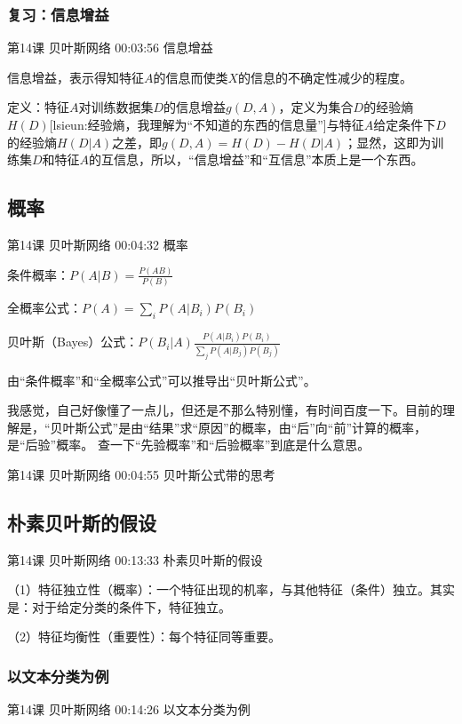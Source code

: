 \documentclass[UTF8]{ctexart}
\begin{document}
\subsubsection{复习：信息增益}

第14课 贝叶斯网络 00:03:56 信息增益

信息增益，表示得知特征$A$的信息而使类$X$的信息的不确定性减少的程度。

定义：特征$A$对训练数据集$D$的信息增益$g(D,A)$，定义为集合$D$的经验熵$H(D)$[lsieun:经验熵，我理解为“不知道的东西的信息量”]与特征$A$给定条件下$D$的经验熵$H(D|A)$之差，即$g(D,A)=H(D)-H(D|A)$；显然，这即为训练集$D$和特征$A$的互信息，所以，“信息增益”和“互信息”本质上是一个东西。

\subsection{概率}

第14课 贝叶斯网络 00:04:32 概率

条件概率：$P(A|B)=\frac{P(AB)}{P(B)}$

全概率公式：$P(A)=\sum_{i}P(A|B_{i})P(B_{i})$

贝叶斯（Bayes）公式：$P(B_{i}|A)\frac{P(A|B_{i})P(B_{i})}{\sum_{j}P(A|B_{j})P(B_{j})}$

由“条件概率”和“全概率公式”可以推导出“贝叶斯公式”。

我感觉，自己好像懂了一点儿，但还是不那么特别懂，有时间百度一下。目前的理解是，“贝叶斯公式”是由“结果”求“原因”的概率，由“后”向“前”计算的概率，是“后验”概率。 查一下“先验概率”和“后验概率”到底是什么意思。

第14课 贝叶斯网络 00:04:55 贝叶斯公式带的思考

\subsection{朴素贝叶斯的假设}

第14课 贝叶斯网络 00:13:33 朴素贝叶斯的假设

（1）特征独立性（概率）：一个特征出现的机率，与其他特征（条件）独立。其实是：对于给定分类的条件下，特征独立。

（2）特征均衡性（重要性）：每个特征同等重要。

\subsubsection{以文本分类为例}

第14课 贝叶斯网络 00:14:26 以文本分类为例
\end{document}
